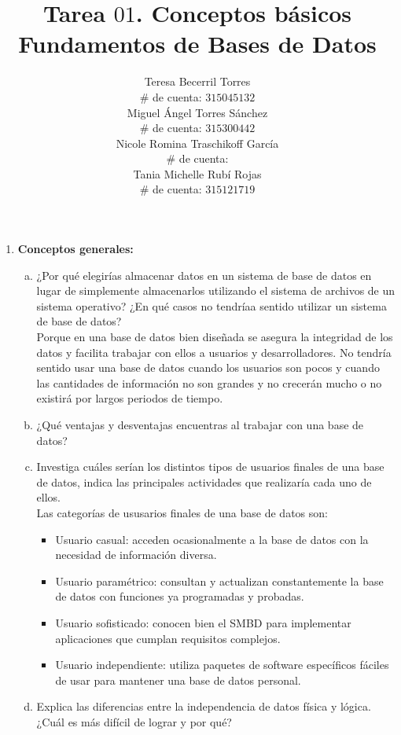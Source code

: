 \documentclass[letterpaper,11pt]{article}
\title{Tarea $01$. Conceptos básicos \\
       Fundamentos de Bases de Datos}
\author{Teresa Becerril Torres \\
        $\#$ de cuenta: $315045132$ \\
        Miguel Ángel Torres Sánchez \\
        $\#$ de cuenta: $315300442$ \\
        Nicole Romina Traschikoff García \\
        $\#$ de cuenta: \\
        Tania Michelle Rubí Rojas \\
        $\#$ de cuenta: $315121719$}
\begin{document}
\maketitle

\begin{enumerate}
    \item \textbf{Conceptos generales:}
    \begin{enumerate}[a. ]
        \item ¿Por qué elegirías almacenar datos en un sistema de base de datos en lugar de simplemente almacenarlos utilizando el sistema de archivos de un sistema operativo? ¿En qué casos no tendríaa sentido utilizar un sistema de base de datos?\\
	Porque en una base de datos bien diseñada se asegura la integridad de los datos y facilita trabajar con ellos a usuarios y desarrolladores. No tendría sentido usar una base de datos cuando los usuarios son pocos y cuando las cantidades de información no son grandes y no crecerán mucho o no existirá por largos periodos de tiempo.

        \item ¿Qué ventajas y desventajas encuentras al trabajar con una base de datos?

        \item Investiga cuáles serían los distintos tipos de usuarios finales de una base de datos, indica las principales actividades que realizaría cada uno de ellos.\\
	Las categorías de ususarios finales de una base de datos son:

	\begin{itemize}
		\item Usuario casual: acceden ocasionalmente a la base de datos con la necesidad de información diversa.
		\item Usuario paramétrico: consultan y actualizan constantemente la base de datos con funciones ya programadas y probadas.
		\item Usuario sofisticado: conocen bien el SMBD para implementar aplicaciones que cumplan requisitos complejos.
		\item Usuario independiente: utiliza paquetes de software específicos fáciles de usar para mantener una base de datos personal.
	\end{itemize}

        \item Explica las diferencias entre la independencia de datos física y lógica. ¿Cuál es más difícil de lograr y por qué?


\end{enumerate}
\end{enumerate}
\end{document}
